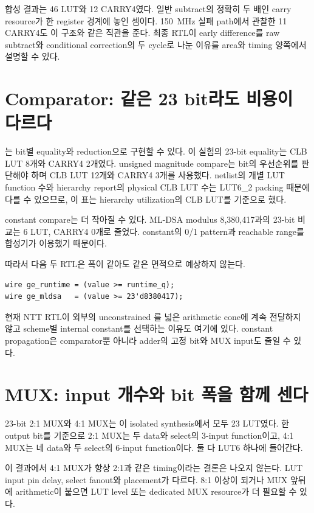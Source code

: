 합성 결과는 46 LUT와 12 CARRY4였다. 일반 subtract의 정확히 두 배인 carry
resource가 한 register 경계에 놓인 셈이다. 150~MHz 실패 path에서 관찰한
11 CARRY4도 이 구조와 같은 직관을 준다. 최종 RTL이 early difference를
raw subtract와 conditional correction의 두 cycle로 나눈 이유를 area와
timing 양쪽에서 설명할 수 있다.

\section{Comparator: 같은 23 bit라도 비용이 다르다}

\rtlfile{==}는 bit별 equality와 reduction으로 구현할 수 있다. 이 실험의
23-bit equality는 CLB LUT 8개와 CARRY4 2개였다. unsigned magnitude compare는
bit의 우선순위를 판단해야 하며 CLB LUT 12개와 CARRY4 3개를 사용했다. netlist의
개별 LUT function 수와 hierarchy report의 physical CLB LUT 수는 LUT6\_2 packing
때문에 다를 수 있으므로, 이 표는 hierarchy utilization의 CLB LUT를 기준으로 했다.

constant compare는 더 작아질 수 있다. ML-DSA modulus
8,380,417과의 23-bit \rtlfile{>=} 비교는 6 LUT, CARRY4 0개로 줄었다.
constant의 0/1 pattern과 reachable range를 합성기가 이용했기 때문이다.

따라서 다음 두 RTL은 폭이 같아도 같은 면적으로 예상하지 않는다.

\begin{lstlisting}
wire ge_runtime = (value >= runtime_q);
wire ge_mldsa   = (value >= 23'd8380417);
\end{lstlisting}

현재 NTT RTL이 외부의 unconstrained 를 넓은 arithmetic cone에
계속 전달하지 않고 scheme별 internal constant를 선택하는 이유도 여기에 있다.
constant propagation은 comparator뿐 아니라 adder의 고정 bit와 MUX input도
줄일 수 있다.

\section{MUX: input 개수와 bit 폭을 함께 센다}

23-bit 2:1 MUX와 4:1 MUX는 이 isolated synthesis에서 모두 23 LUT였다.
한 output bit를 기준으로 2:1 MUX는 두 data와 select의 3-input function이고,
4:1 MUX는 네 data와 두 select의 6-input function이다. 둘 다 LUT6 하나에
들어간다.

이 결과에서 4:1 MUX가 항상 2:1과 같은 timing이라는 결론은 나오지 않는다.
LUT input pin delay, select fanout와 placement가 다르다. 8:1 이상이 되거나
MUX 앞뒤에 arithmetic이 붙으면 LUT level 또는 dedicated MUX resource가
더 필요할 수 있다.

